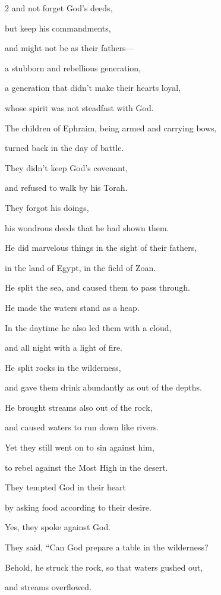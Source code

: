 \begin{multicols}{2}
	and not forget God’s deeds,
	
	but keep his commandments,
	
	
	\myverse{}and might not be as their fathers---
	
	a stubborn and rebellious generation,
	
	a generation that didn’t make their hearts loyal,
	
	whose spirit was not steadfast with God.
	
	
	\myverse{}The children of Ephraim, being armed and carrying bows,
	
	turned back in the day of battle.
	
	
	\myverse{}They didn’t keep God’s covenant,
	
	and refused to walk by his Torah.
	
	
	\myverse{}They forgot his doings,
	
	his wondrous deeds that he had shown them.
	
	
	\myverse{}He did marvelous things in the sight of their fathers,
	
	in the land of Egypt, in the field of Zoan.
	
	
	\myverse{}He split the sea, and caused them to pass through.
	
	He made the waters stand as a heap.
	
	
	\myverse{}In the daytime he also led them with a cloud,
	
	and all night with a light of fire.
	
	
	\myverse{}He split rocks in the wilderness,
	
	and gave them drink abundantly as out of the depths.
	
	
	\myverse{}He brought streams also out of the rock,
	
	and caused waters to run down like rivers.
	
	
	\myverse{}Yet they still went on to sin against him,
	
	to rebel against the Most High in the desert.
	
	
	\myverse{}They tempted God in their heart
	
	by asking food according to their desire.
	
	
	\myverse{}Yes, they spoke against God.
	
	They said, “Can God prepare a table in the wilderness?
	
	
	\myverse{}Behold, he struck the rock, so that waters gushed out,
	
	and streams overflowed.
	

\end{multicols}
